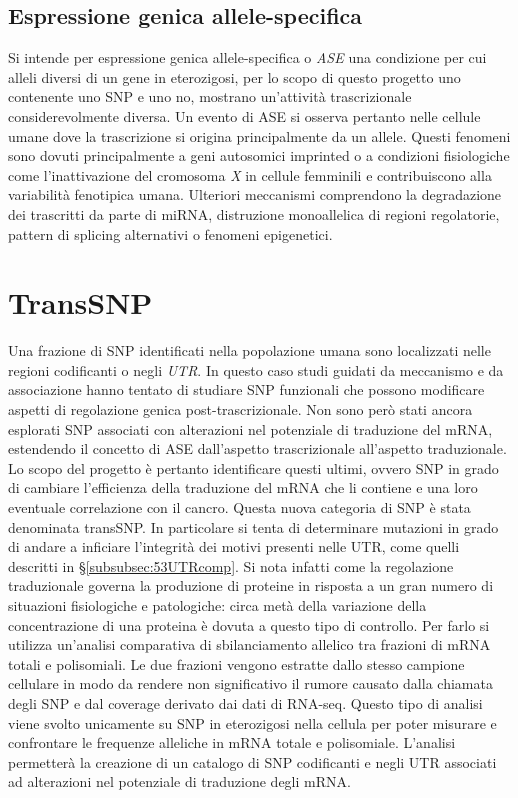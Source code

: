 \subsection{Espressione genica allele-specifica}
Si intende per espressione genica allele-specifica o \emph{ASE} una condizione per cui alleli diversi di un gene in eterozigosi, per lo scopo di questo progetto uno contenente uno SNP e uno no, mostrano un'attivit\`a trascrizionale considerevolmente diversa.
Un evento di ASE si osserva pertanto nelle cellule umane dove la trascrizione si origina principalmente da un allele.
Questi fenomeni sono dovuti principalmente a geni autosomici imprinted o a condizioni fisiologiche come l'inattivazione del cromosoma \emph{X} in cellule femminili e contribuiscono alla variabilit\`a fenotipica umana.
Ulteriori meccanismi comprendono la degradazione dei trascritti da parte di miRNA, distruzione monoallelica di regioni regolatorie, pattern di splicing alternativi o fenomeni epigenetici.

\section{TransSNP}
Una frazione di SNP identificati nella popolazione umana sono localizzati nelle regioni codificanti o negli \emph{UTR}.
In questo caso studi guidati da meccanismo e da associazione hanno tentato di studiare SNP funzionali che possono modificare aspetti di regolazione genica post-trascrizionale.
Non sono per\`o stati ancora esplorati SNP associati con alterazioni nel potenziale di traduzione del mRNA, estendendo il concetto di ASE dall'aspetto trascrizionale all'aspetto traduzionale.
Lo scopo del progetto \`e pertanto identificare questi ultimi, ovvero SNP in grado di cambiare l'efficienza della traduzione del mRNA che li contiene e una loro eventuale correlazione con il cancro.
Questa nuova categoria di SNP \`e stata denominata transSNP.
In particolare si tenta di determinare mutazioni in grado di andare a inficiare l'integrit\`a dei motivi presenti nelle UTR, come quelli descritti in \S\ref{subsubsec:53UTRcomp}.
Si nota infatti come la regolazione traduzionale governa la produzione di proteine in risposta a un gran numero di situazioni fisiologiche e patologiche: circa met\`a della variazione della concentrazione di una proteina \`e dovuta a questo tipo di controllo.
Per farlo si utilizza un'analisi comparativa di sbilanciamento allelico tra frazioni di mRNA totali e polisomiali.
Le due frazioni vengono estratte dallo stesso campione cellulare in modo da rendere non significativo il rumore causato dalla chiamata degli SNP e dal coverage derivato dai dati di RNA-seq.
Questo tipo di analisi viene svolto unicamente su SNP in eterozigosi nella cellula per poter misurare e confrontare le frequenze alleliche in mRNA totale e polisomiale.
L'analisi permetter\`a  la creazione di un catalogo di SNP codificanti e negli UTR associati ad alterazioni nel potenziale di traduzione degli mRNA.


